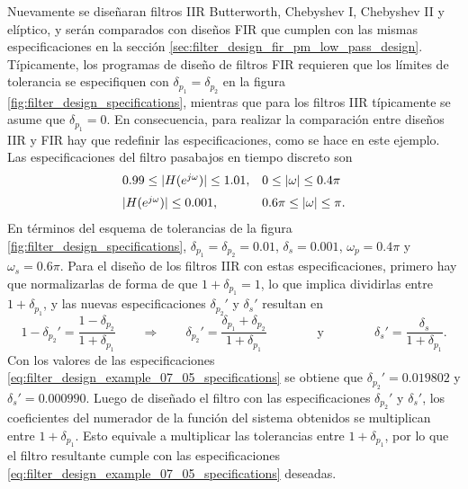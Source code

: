 \documentclass[a4paper]{report}
\begin{document}
Nuevamente se diseñaran filtros IIR Butterworth, Chebyshev I, Chebyshev II y elíptico, y serán comparados con diseños FIR que cumplen con las mismas especificaciones en la sección \ref{sec:filter_design_fir_pm_low_pass_design}. Típicamente, los programas de diseño de filtros FIR requieren que los límites de tolerancia se especifiquen con \(\delta_{p_1}=\delta_{p_2}\) en la figura \ref{fig:filter_design_specifications}, mientras que para los filtros IIR típicamente se asume que  \(\delta_{p_1}=0\). En consecuencia, para realizar la comparación entre diseños IIR y FIR hay que redefinir las especificaciones, como se hace en este ejemplo. Las especificaciones del filtro pasabajos en tiempo discreto son
\begin{equation}\label{eq:filter_design_example_07_05_specifications}
 \begin{array}{ll}
  0.99\leq|H(e^{j\omega})|\leq1.01, & 0\leq|\omega|\leq0.4\pi\\[\medskipamount]
  |H(e^{j\omega})|\leq0.001, & 0.6\pi\leq|\omega|\leq\pi.
 \end{array} 
\end{equation}
En términos del esquema de tolerancias de la figura \ref{fig:filter_design_specifications}, \(\delta_{p_1}=\delta_{p_2}=0.01\), \(\delta_s=0.001\), \(\omega_p=0.4\pi\) y \(\omega_s=0.6\pi\). Para el diseño de los filtros IIR con estas especificaciones, primero hay que normalizarlas de forma de que \(1+\delta_{p_1}=1\), lo que implica dividirlas entre \(1+\delta_{p_1}\), y las nuevas especificaciones \(\delta_{p_2}'\) y \(\delta_s'\) resultan en
\[
 1-\delta_{p_2}'=\frac{1-\delta_{p_2}}{1+\delta_{p_1}}
 \qquad\Rightarrow\qquad
 \delta_{p_2}'=\frac{\delta_{p_1}+\delta_{p_2}}{1+\delta_{p_1}}
 \qquad\qquad\textrm{y}\qquad\qquad
 \delta_s'=\frac{\delta_s}{1+\delta_{p_1}}.
\]
Con los valores de las especificaciones \ref{eq:filter_design_example_07_05_specifications} se obtiene que \(\delta_{p_2}' = 0.019802\) y \(\delta_s' = 0.000990\).
Luego de diseñado el filtro con las especificaciones \(\delta_{p_2}'\) y \(\delta_s'\), los coeficientes del numerador de la función del sistema obtenidos se multiplican entre \(1+\delta_{p_1}\). Esto equivale a multiplicar las tolerancias entre \(1+\delta_{p_1}\), por lo que el filtro resultante cumple con las especificaciones \ref{eq:filter_design_example_07_05_specifications} deseadas. 
\end{document}
